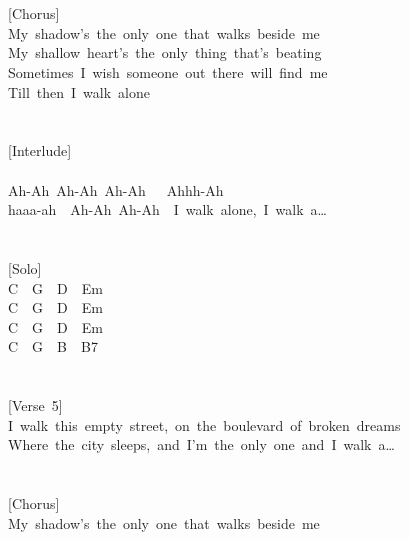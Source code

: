 \documentclass[]{book}
\begin{document}
~\\
~\\
{[}Chorus{]}\\
\hspace*{0.333em}\hspace*{0.333em}\hspace*{0.333em}\hspace*{0.333em}My~shadow's~the~only~one~that~walks~beside~me\\
\hspace*{0.333em}\hspace*{0.333em}\hspace*{0.333em}\hspace*{0.333em}My~shallow~heart's~the~only~thing~that's~beating\\
\hspace*{0.333em}\hspace*{0.333em}\hspace*{0.333em}\hspace*{0.333em}Sometimes~I~wish~someone~out~there~will~find~me\\
\hspace*{0.333em}\hspace*{0.333em}\hspace*{0.333em}\hspace*{0.333em}Till~then~I~walk~alone\\
~\\
~\\
{[}Interlude{]}\\
~\\
Ah-Ah~Ah-Ah~Ah-Ah~~~Ahhh-Ah\\
haaa-ah~~Ah-Ah~Ah-Ah~~I~walk~alone,~I~walk~a\ldots{}\\
~\\
~\\
{[}Solo{]}\\
C~~G~~D~~Em\\
C~~G~~D~~Em\\
C~~G~~D~~Em\\
C~~G~~B~~B7\\
~\\
~\\
{[}Verse~5{]}\\
I~walk~this~empty~street,~on~the~boulevard~of~broken~dreams\\
Where~the~city~sleeps,~and~I'm~the~only~one~and~I~walk~a\ldots{}\\
~\\
~\\
{[}Chorus{]}\\
\hspace*{0.333em}\hspace*{0.333em}\hspace*{0.333em}\hspace*{0.333em}My~shadow's~the~only~one~that~walks~beside~me\\
\end{document}
